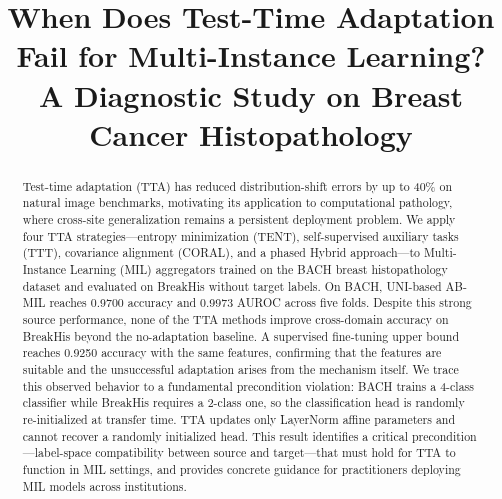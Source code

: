 \documentclass[conference]{IEEEtran}
\begin{document}
\title{When Does Test-Time Adaptation Fail for Multi-Instance Learning? A Diagnostic Study on Breast Cancer Histopathology}

\makeatletter
\newcommand{\linebreakand}{%
  \end{@IEEEauthorhalign}
  \hfill\mbox{}\par
  \mbox{}\hfill\begin{@IEEEauthorhalign}
}
\makeatother

 
\maketitle

\begin{abstract}
Test-time adaptation (TTA) has reduced distribution-shift errors by up to 40\% on natural image benchmarks, motivating its application to computational pathology, where cross-site generalization remains a persistent deployment problem. We apply four TTA strategies---entropy minimization (TENT), self-supervised auxiliary tasks (TTT), covariance alignment (CORAL), and a phased Hybrid approach---to Multi-Instance Learning (MIL) aggregators trained on the BACH breast histopathology dataset and evaluated on BreakHis without target labels. On BACH, UNI-based AB-MIL reaches 0.9700 accuracy and 0.9973 AUROC across five folds. Despite this strong source performance, none of the TTA methods improve cross-domain accuracy on BreakHis beyond the no-adaptation baseline. A supervised fine-tuning upper bound reaches 0.9250 accuracy with the same features, confirming that the features are suitable and the unsuccessful adaptation arises from the mechanism itself. We trace this observed behavior to a fundamental precondition violation: BACH trains a 4-class classifier while BreakHis requires a 2-class one, so the classification head is randomly re-initialized at transfer time. TTA updates only LayerNorm affine parameters and cannot recover a randomly initialized head. This result identifies a critical precondition---label-space compatibility between source and target---that must hold for TTA to function in MIL settings, and provides concrete guidance for practitioners deploying MIL models across institutions.
\end{abstract}
\end{document}

